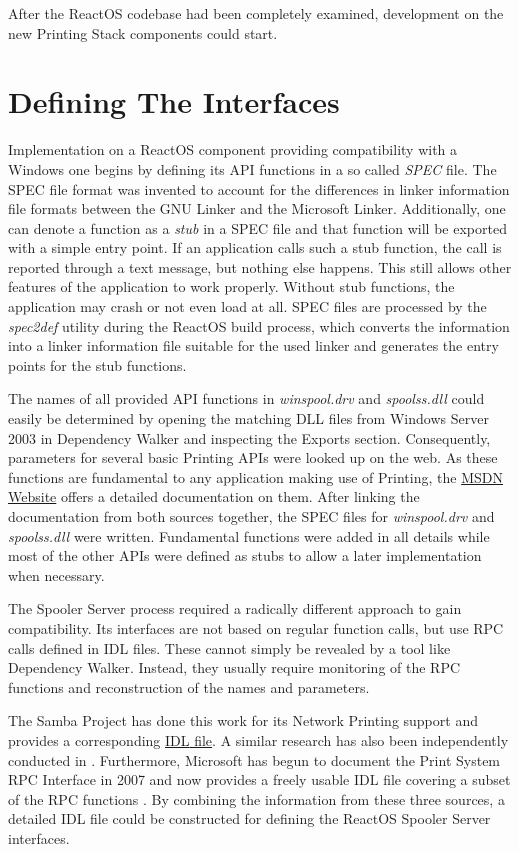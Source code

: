 After the ReactOS codebase had been completely examined, development on the new Printing Stack components could start.


\section{Defining The Interfaces}
Implementation on a ReactOS component providing compatibility with a Windows one begins by defining its \gls{API} functions in a so called \emph{SPEC} file.
The SPEC file format was invented to account for the differences in linker information file formats between the GNU Linker and the Microsoft Linker.
Additionally, one can denote a function as a \emph{stub} in a SPEC file and that function will be exported with a simple entry point.
If an application calls such a stub function, the call is reported through a text message, but nothing else happens.
This still allows other features of the application to work properly.
Without stub functions, the application may crash or not even load at all.
SPEC files are processed by the \emph{spec2def} utility during the ReactOS build process, which converts the information into a linker information file suitable for the used linker and generates the entry points for the stub functions.

The names of all provided \gls{API} functions in \emph{winspool.drv} and \emph{spoolss.dll} could easily be determined by opening the matching \gls{DLL} files from Windows Server 2003 in Dependency Walker and inspecting the Exports section.
Consequently, parameters for several basic Printing \glspl{API} were looked up on the web.
As these functions are fundamental to any application making use of Printing, the \href{http://msdn.microsoft.com}{MSDN Website} offers a detailed documentation on them.
After linking the documentation from both sources together, the SPEC files for \emph{winspool.drv} and \emph{spoolss.dll} were written.
Fundamental functions were added in all details while most of the other \glspl{API} were defined as stubs to allow a later implementation when necessary.

The Spooler Server process required a radically different approach to gain compatibility.
Its interfaces are not based on regular function calls, but use \gls{RPC} calls defined in \gls{IDL} files.
These cannot simply be revealed by a tool like Dependency Walker.
Instead, they usually require monitoring of the \gls{RPC} functions and reconstruction of the names and parameters.

The Samba Project has done this work for its Network Printing support and provides a corresponding \href{https://git.samba.org/?p=samba.git;a=blob;f=librpc/idl/spoolss.idl;hb=618af83d1bd07b12a9acc88b0d2111cab7a8bb2b}{\gls{IDL} file}.
A similar research has also been independently conducted in \cite{marchand2006netsvcs}.
Furthermore, Microsoft has begun to document the Print System \gls{RPC} Interface in 2007 and now provides a freely usable \gls{IDL} file covering a subset of the \gls{RPC} functions \cite{microsoft2014msrprn}.
By combining the information from these three sources, a detailed \gls{IDL} file could be constructed for defining the ReactOS Spooler Server interfaces.


